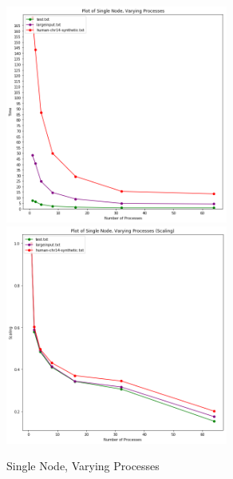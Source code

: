 \documentclass[12pt]{article}
\begin{document}
\begin{figure}[h] 
  \caption{Single Node, Varying Processes}
  \centering 
  \label{graph1}
  \includegraphics[width = 0.65\textwidth]{single_node.png}
  \includegraphics[width = 0.65\textwidth]{single_node_scaling.png}
\end{figure}
\end{document}
